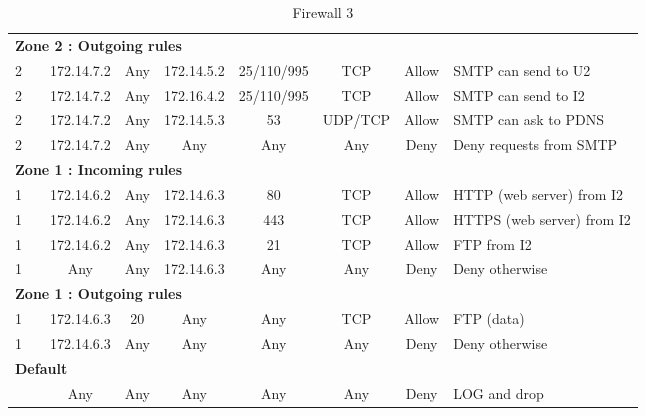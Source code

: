 \documentclass[a4paper,titlepage]{article}
\begin{document}
\begin{landscape}
\begin{table}[h]
\begin{tabular}{c|c|cc|cc|ccl}
			\hline
			\multicolumn{9}{l}{\textbf{Zone 2 : Outgoing rules}}\\
			2 &  & 172.14.7.2 & Any & 172.14.5.2 & 25/110/995 & TCP & Allow & SMTP can send to U2\\
			2 &  & 172.14.7.2 & Any & 172.16.4.2 & 25/110/995 & TCP & Allow & SMTP can send to I2\\
			2 &  & 172.14.7.2 & Any & 172.14.5.3 & 53 & UDP/TCP & Allow & SMTP can ask to PDNS\\
			2 &  & 172.14.7.2 & Any & Any & Any & Any & Deny & Deny requests from SMTP\\

			\hline
			\multicolumn{9}{l}{\textbf{Zone 1 : Incoming rules}}\\
			1 &  & 172.14.6.2  & Any & 172.14.6.3 & 80 & TCP & Allow & HTTP (web server) from I2\\
			1 &  & 172.14.6.2  & Any & 172.14.6.3 & 443 & TCP & Allow & HTTPS (web server) from I2\\
			1 &  & 172.14.6.2 & Any & 172.14.6.3 & 21 & TCP & Allow & FTP from I2\\
			1 &  & Any & Any & 172.14.6.3 & Any & Any & Deny & Deny otherwise\\

			\hline
			\multicolumn{9}{l}{\textbf{Zone 1 : Outgoing rules}}\\
			1 &  & 172.14.6.3 & 20 & Any & Any & TCP & Allow & FTP (data)\\
			1 &  & 172.14.6.3 & Any & Any & Any & Any & Deny & Deny otherwise\\
			\multicolumn{9}{l}{\textbf{Default}}\\
			 &  & Any & Any & Any & Any & Any & Deny & LOG and drop\\
		\end{tabular}
		\caption{Firewall 3}
	\end{table}
	\vspace*{\fill}
\end{landscape}



\end{document}
